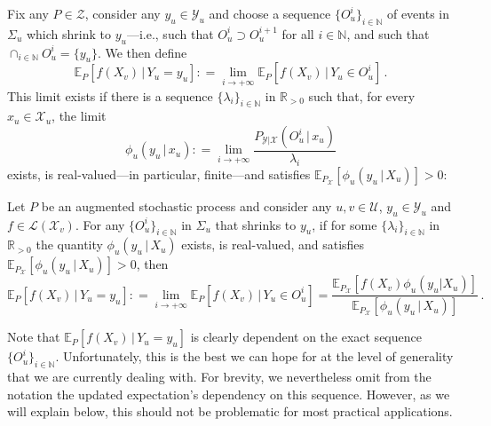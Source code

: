 \documentclass[twoside,11pt]{article}
\newcommand{\nats}{\mathbb{N}}
\newcommand{\reals}{\mathbb{R}}
\newcommand{\realspos}{\reals_{>0}}
\newcommand{\states}{\mathcal{X}}
\newcommand{\observs}{\mathcal{Y}}
\newcommand{\gambles}{\mathcal{L}}
\newcommand{\coloneqq}{:\!=}
\begin{document}
Fix any $P\in\mathcal{Z}$, consider any $y_u\in\observs_u$ and choose a sequence $\{O_u^i\}_{i\in\nats}$ of events in $\Sigma_u$ which shrink to $y_u$---i.e., such that $O_u^i\supset O_u^{i+1}$ for all $i\in\nats$, and such that $\cap_{i\in\nats} O_u^i=\{y_u\}$. We then define
\begin{equation}\label{eq:def:precise_updated_limit}
\mathbb{E}_P[f(X_v)\,\vert\,Y_u=y_u] \coloneqq \lim_{i\to+\infty} \mathbb{E}_P[f(X_v)\,\vert\,Y_u\in O_u^i]\,.
\end{equation}
This limit exists if there is a sequence $\{\lambda_i\}_{i\in\nats}$ in $\realspos$ such that, for every $x_u\in\states_u$, the limit
\begin{equation*}
\phi_u(y_u\,\vert\, x_u) \coloneqq \lim_{i\to+\infty}\frac{P_{\observs\vert\states}(O_u^i\,\vert\, x_u)}{\lambda_i}
\end{equation*}
exists, is real-valued---in particular, finite---and satisfies $\mathbb{E}_{P_\states}[\phi_u(y_u\,\vert\,X_u)]>0$:
\begin{proposition}\label{prop:precise_bayes_rule_densities}
Let $P$ be an augmented stochastic process and consider any $u,v\in\mathcal{U}$, $y_u\in\observs_u$ and $f\in\gambles(\states_v)$. For any $\{O_u^i\}_{i\in\nats}$ in $\Sigma_u$ that shrinks to $y_u$, if for some $\{\lambda_i\}_{i\in\nats}$ in $\realspos$ the quantity $\phi_u(y_u\,\vert\,X_u)$ exists, is real-valued, and satisfies $\mathbb{E}_{P_\states}[\phi_u(y_u\,\vert\,X_u)]>0$, then
\begin{equation}\label{eq:updated_expectation_is_limit}
\mathbb{E}_P[f(X_v)\,\vert\,Y_u=y_u] \coloneqq \lim_{i\to+\infty} \mathbb{E}_P[f(X_v)\,\vert\,Y_u\in O_u^i] = \frac{\mathbb{E}_{P_\states}[f(X_v)\phi_u(y_u\vert X_u)]}{\mathbb{E}_{P_\states}[\phi_u(y_u\,\vert\,X_u)]}\,.
\end{equation}
\end{proposition}
Note that $\mathbb{E}_P[f(X_v)\,\vert\,Y_u=y_u]$ is clearly dependent on the exact sequence $\{O_u^i\}_{i\in\nats}$. Unfortunately, this is the best we can hope for at the level of generality that we are currently dealing with. %
For brevity, we nevertheless omit from the notation the updated expectation's dependency on this sequence. However, as we will explain below, this should not be problematic for most practical applications.
\end{document}
